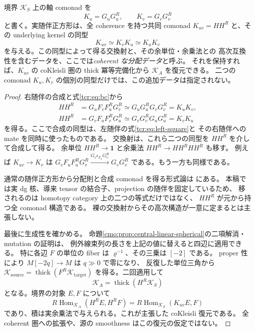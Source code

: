 \begin{proposition}
\label{tcr:prop:joint-comonad}
境界 $\mathcal K_S$ 上の軸 comonad を
\[
             K_u=G_uG_u^R,\qquad K_v=G_vG_v^R
\]
と書く。実随伴正方形は、全 coherence を持つ共同 comonad
$K_{uv}=HH^R$ と、その underlying kernel の同型
\begin{equation}\label{tcr:eq:joint-factorization}
                    K_{uv}\simeq K_vK_u\simeq K_uK_v
\end{equation}
を与える。この同型によって得る交換射と、その余単位・余乗法との
高次互換性を含むデータを、ここでは\emph{coherent な分配データ}と呼ぶ。
それを保持すれば、$K_{uv}$ の coKleisli 圏の thick 冪等完備化から
$\mathcal K_A$ を復元できる。
二つの comonad $K_u,K_v$ の個別の同型だけでは、この追加データは指定されない。
\end{proposition}

\begin{proof}
右随伴の合成と式\eqref{tcr:eq:bc}から
\[
 \begin{aligned}
 HH^R
   &=G_uF_vF_u^RG_v^R
     \simeq G_uG_u^RG_vG_v^R=K_uK_v,\\
 HH^R
   &=G_vF_uF_v^RG_u^R
     \simeq G_vG_v^RG_uG_u^R=K_vK_u
 \end{aligned}
\]
を得る。ここで合成の同型は、左随伴の式\eqref{tcr:eq:left-square}と
その右随伴への mate を同時に使ったものである。
交換射は、これら二つの同型を $HH^R$ を介して合成して得る。
余単位 $HH^R\to\mathbf1$ と余乗法 $HH^R\to HH^RHH^R$ も移す。
例えば $K_{uv}\to K_v$ は
$G_vF_uF_u^RG_v^R\xrightarrow{G_v\epsilon_{F_u}G_v^R}G_vG_v^R$
である。もう一方も同様である。

通常の随伴正方形から分配則と合成 comonad を得る形式論は
\cite[Section~3, Proposition]{CMOBeckDistributiveLaws}にある。
本稿では実 dg 核、導来 tensor の結合子、projection の随伴を固定しているため、
移されるのは homotopy category 上の二つの等式だけではなく、
$HH^R$ が元から持つ全 comonad 構造である。
裸の交換射からその高次構造が一意に定まるとは主張しない。

最後に生成性を確かめる。
命題\ref{cmo:prop:central-linear-spherical}の二項解消・mutation の証明は、
例外線束列の長さを上記の値に替えると四辺に適用できる。
特に各辺 $F$ の単位の fiber は $\varrho^{-1}$、その三乗は $[-2]$ である。
proper 性により $M[-2q]\to M$ は $q\gg0$ で零になり、
反復した単位三角から
$\mathcal K_{\mathrm{source}}=\operatorname{thick}(F^R\mathcal K_{\mathrm{target}})$
を得る。二回適用して
\[
                  \mathcal K_A=\operatorname{thick}(H^R\mathcal K_S)
\]
となる。境界の対象 $E,F$ について
\[
 R\operatorname{Hom}_{\mathcal K_A}(H^RE,H^RF)
    =R\operatorname{Hom}_{\mathcal K_S}(K_{uv}E,F)
\]
であり、積は実余乗法で与えられる。これが主張した coKleisli 復元である。
全 coherent 圏への拡張や、源の smoothness はこの復元の仮定ではない。
\end{proof}

